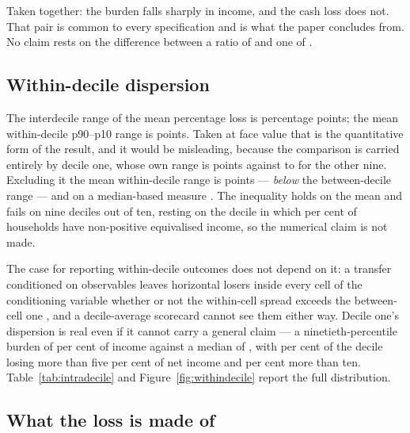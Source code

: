 Taken together: the burden falls sharply in income, and the cash loss does not. That pair is common to every specification and is what the paper concludes from. No claim rests on the difference between a ratio of \genDecileRatioPct{} and one of \genOnsFuelDecileRatioPct{}.

\subsection{Within-decile dispersion}
\label{sec:results-heterogeneity}

The interdecile range of the mean percentage loss is \genBetweenDecileRangePct{} percentage points; the mean within-decile p90--p10 range is \genWithinDecileRangePct{} points. Taken at face value that is the quantitative form of the \citet{cronin2019} result, and it would be misleading, because the comparison is carried entirely by decile one, whose own range is \genDecileOneRangePct{} points against \genWithinDecileRangeMinExDOnePct{} to \genWithinDecileRangeMaxExDOnePct{} for the other nine. Excluding it the mean within-decile range is \genWithinDecileRangeExDOnePct{} points --- \emph{below} the between-decile range --- and on a median-based measure \genWithinDecileMedianRangePct{}. The inequality holds on the mean and fails on nine deciles out of ten, resting on the decile in which \genDecileOneZeroIncomeShare{} per cent of households have non-positive equivalised income, so the numerical claim is not made.

The case for reporting within-decile outcomes does not depend on it: a transfer conditioned on observables leaves horizontal losers inside every cell of the conditioning variable whether or not the within-cell spread exceeds the between-cell one \citep{cronin2019,sallee2019}, and a decile-average scorecard cannot see them either way. Decile one's dispersion is real even if it cannot carry a general claim --- a ninetieth-percentile burden of \genDecileOnePNinetyLossPct{} per cent of income against a median of \genDecileOneMedianLossPct{}, with \genDecileOneShareAboveFivePct{} per cent of the decile losing more than five per cent of net income and \genDecileOneShareAboveTenPct{} per cent more than ten. Table~\ref{tab:intradecile} and Figure~\ref{fig:withindecile} report the full distribution.

\subsection{What the loss is made of}
\label{sec:results-fuel}

